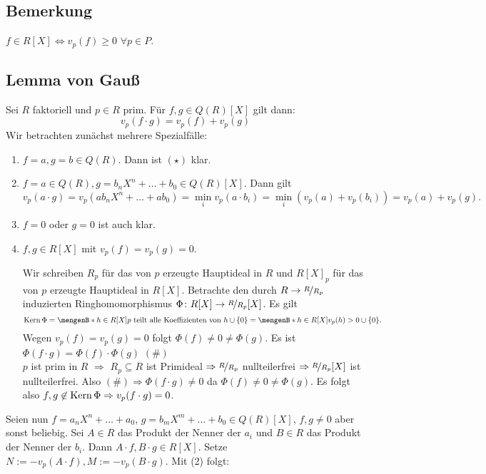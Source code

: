 \subsection[Bemerkung: Ordnungsabbildung zum testen, ob Koeffizienten im Ring]{Bemerkung} %
\label{sub:812}
$f \in R[X] \iff v_p(f)\ge 0$ $\forall p \in P$.

\subsection{Lemma von Gauß} %
\label{sub:813}
Sei $R$ faktoriell und $p \in R$ prim. Für $f,g \in Q(R)[X]$ gilt dann: 
\[
	v_p(f \cdot g) = v_p(f)+ v_p(g) \tag{$\star$}
\]
Wir betrachten zunächst mehrere Spezialfälle:
\begin{enumerate}[(1)]
	\item $f =a, g=b \in Q(R)$. Dann ist $(\star)$ klar.
	\item $f= a \in Q(R), g= b_n X^n + \ldots + b_0 \in Q(R)[X]$. Dann gilt
	\[
		v_p(a \cdot g) = v_p(a b_n X^n + \ldots + a b_0) = \min_i v_p(a \cdot b_i) = \min_i (v_p(a)+ v_p(b_i)) = v_p(a) + v_p(g).
	\]
	\item $f=0$ oder $g=0$ ist auch klar.
	\item $f,g \in R[X]$ mit $v_p(f)=v_p(g)=0$. 
	
	Wir schreiben $R_p$ für das von $p$ erzeugte Hauptideal in $R$ und $R[X]_p$ für das von $p$ erzeugte Hauptideal in $R[X]$. Betrachte den durch $R \to \nicefrac{R}{R_p}$
	induzierten Ringhomomorphismus $\Phi \colon R[X] \to \nicefrac{R}{R_p}[X]$. Es gilt 
	\[
		\Kern \Phi = \set[{h \in R[X]}]{p \text{ teilt alle Koeffizienten von }h} \cup \{0\}  = \set[{h \in R[X]}]{v_p(h) > 0} \cup \{0\}. 
	\]
	Wegen $v_p(f) = v_p(g)=0$ folgt $\Phi(f) \not= 0 \not= \Phi (g)$. Es ist $\Phi(f \cdot g) = \Phi(f) \cdot \Phi(g)$ \hfill $(\#)$ \\
	$p$ ist prim in $R$ $\Rightarrow $ $R_p \subseteq R$ ist Primideal $\Rightarrow \nicefrac{R}{R_p}$ nullteilerfrei $\Rightarrow \nicefrac{R}{R_p}[X]$ ist nullteilerfrei.
	Also $(\#) \Rightarrow \Phi(f \cdot g) \not= 0$ da $\Phi(f) \not= 0 \not= \Phi(g)$. Es folgt also $f,g \not\in \operatorname{Kern} \Phi \Rightarrow v_p(f \cdot g)=0$.
\end{enumerate}
Seien nun $f = a_n X^n + \ldots + a_0$, $g = b_m X^m + \ldots + b_0 \in Q(R)[X]$, $f,g \not= 0$ aber sonst beliebig. Sei $A \in R$ das Produkt der Nenner der $a_i$ und 
$B \in R$ das Produkt der Nenner der $b_i$. Dann $A \cdot f, B \cdot g \in R[X]$. Setze $N := - v_p(A \cdot f), M := - v_p(B \cdot g)$. Mit (2) folgt:
